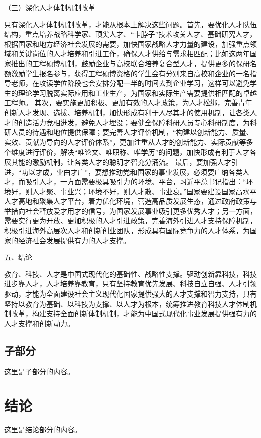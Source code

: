 \documentclass{article} %
\begin{document}
\begin{CJK*}{UTF8}{gbsn}
（三）深化人才体制机制改革

只有深化人才体制机制改革，才能从根本上解决这些问题。首先，要优化人才队伍结构，重点培养战略科学家、顶尖人才、“卡脖子”技术攻关人才、基础研究人才，根据国家和地方经济社会发展的需要，加快国家战略人才力量的建设，加强重点领域和关键岗位的人才培养和引进工作，确保人才供给与需求相匹配；比如这两年国家推出的工程硕博机制，鼓励企业与高校联合培养复合型人才，提供更多的保研名额激励学生报名参与，获得工程硕博资格的学生会有分别来自高校和企业的一名指导老师，在攻读学位阶段也会安排分配一半的时间去到企业学习，这样可以避免学生的理论学习脱离实际应用和工业生产，为国家和实际生产需要提供相匹配的卓越工程师。
其次，要实施更加积极、更加有效的人才政策，为人才松绑，完善青年创新人才发现、选拔、培养机制，加快形成有利于人尽其才的使用机制，让各类人才的创造活力竞相迸发，避免人才埋没；要健全保障科研人员专心科研制度，为科研人员的待遇和地位提供保障；要完善人才评价机制，“构建以创新能力、质量、实效、贡献为导向的人才评价体系”，更加注重从人才的创新能力、实际贡献等多个维度进行评价，解决“唯论文、唯职称、唯学历”的问题，加快形成有利于人才各展其能的激励机制，让各类人才的聪明才智充分涌流。
最后，要加强人才引进，“功以才成，业由才广”，要想推动党和国家的事业发展，必须要广纳各类人才，而吸引人才，一方面需要极具吸引力的环境、平台，习近平总书记指出：“环境好，则人才聚、事业兴；环境不好，则人才散、事业衰。”国家要建设国家高水平人才高地和聚集人才平台，着力优化环境，营造高品质发展生态，通过政府政策与举措向社会释放爱才用才的信号，为国家发展事业吸引更多优秀人才；另一方面，需要实行更为开放、更加积极的人才引进政策，完善海外引进人才支持保障机制，积极引进海外高层次人才和创新创业团队，形成具有国际竞争力的人才体系，为国家的经济社会发展提供有力的人才支撑。

五、结论

教育、科技、人才是中国式现代化的基础性、战略性支撑。驱动创新靠科技，科技进步靠人才，人才培养靠教育，只有坚持教育优先发展、科技自立自强、人才引领驱动，才能为全面建设社会主义现代化国家提供强大的人才支撑和智力支持，只有坚持以教育为基础、以科技为支撑、以人才为根本，统筹推进教育科技人才体制机制改革，构建支持全面创新体制机制，才能为中国式现代化事业发展提供强有力的人才支撑和创新动力。

\subsection{子部分}
这里是子部分的内容。

\section{结论}
这里是结论部分的内容。

\end{CJK*}

\end{document}
